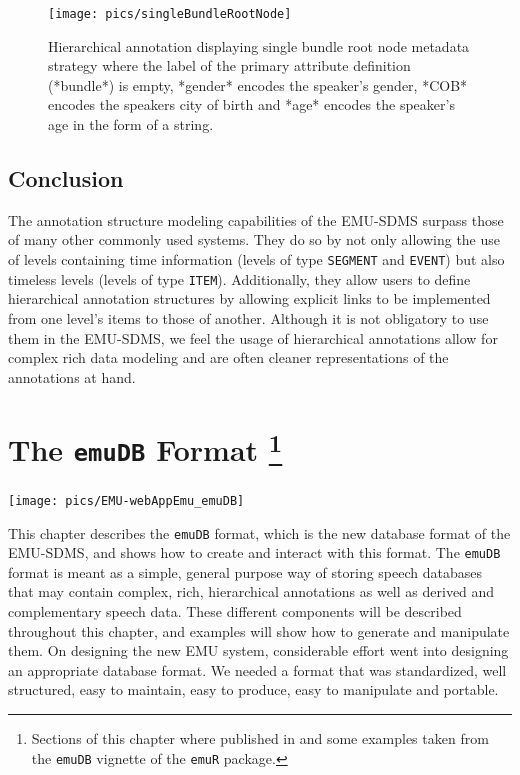 \documentclass[]{book}
\let\rmarkdownfootnote\footnote%
\def\footnote{\protect\rmarkdownfootnote}
\begin{document}
\begin{figure}

{\centering \texttt{[image: pics/singleBundleRootNode]} 

}

\caption{Hierarchical annotation displaying single bundle root node metadata strategy where the label of the primary attribute definition (*bundle*) is empty, *gender* encodes the speaker's gender, *COB* encodes the speakers city of birth and *age* encodes the speaker's age in the form of a string.}\label{fig:singleBundleRootNode}
\end{figure}

\hypertarget{conclusion-1}{%
\section{Conclusion}\label{conclusion-1}}

The annotation structure modeling capabilities of the EMU-SDMS surpass those of many other commonly used systems. They do so by not only allowing the use of levels containing time information (levels of type \texttt{SEGMENT} and \texttt{EVENT}) but also timeless levels (levels of type \texttt{ITEM}). Additionally, they allow users to define hierarchical annotation structures by allowing explicit links to be implemented from one level's items to those of another. Although it is not obligatory to use them in the EMU-SDMS, we feel the usage of hierarchical annotations allow for complex rich data modeling and are often cleaner representations of the annotations at hand.

\hypertarget{chap:emuDB}{%
\chapter[The \texttt{emuDB} Format ]{\texorpdfstring{The \texttt{emuDB} Format \footnote{Sections of this chapter where published in \citet{winkelmann:2017aa} and some examples taken from the \texttt{emuDB} vignette of the \texttt{emuR} package.}}{The emuDB Format }}\label{chap:emuDB}}

\begin{center}\texttt{[image: pics/EMU-webAppEmu\_emuDB]} \end{center}

This chapter describes the \texttt{emuDB} format, which is the new database format of the EMU-SDMS, and shows how to create and interact with this format. The \texttt{emuDB} format is meant as a simple, general purpose way of storing speech databases that may contain complex, rich, hierarchical annotations as well as derived and complementary speech data. These different components will be described throughout this chapter, and examples will show how to generate and manipulate them. On designing the new EMU system, considerable effort went into designing an appropriate database format. We needed a format that was standardized, well structured, easy to maintain, easy to produce, easy to manipulate and portable.
\end{document}
